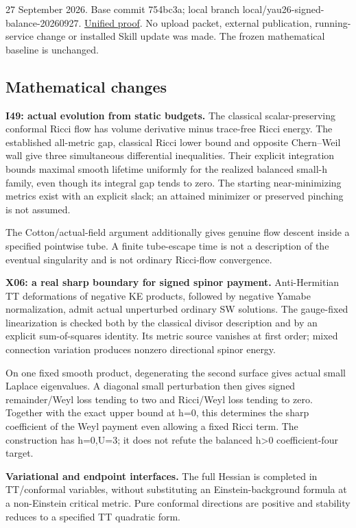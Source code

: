 \documentclass[
  10pt,
]{article}
\begin{document}
27 September 2026. Base commit 754bc3a; local branch
local/yau26-signed-balance-20260927.
\href{../continuation/20260927_signed_balance_and_conformal_flow.md}{Unified
proof}. No upload packet, external publication, running-service change
or installed Skill update was made. The frozen mathematical baseline is
unchanged.

\hypertarget{mathematical-changes-4}{%
\subsection{Mathematical changes}\label{mathematical-changes-4}}

\textbf{I49: actual evolution from static budgets.} The classical
scalar-preserving conformal Ricci flow has volume derivative minus
trace-free Ricci energy. The established all-metric gap, classical Ricci
lower bound and opposite Chern--Weil wall give three simultaneous
differential inequalities. Their explicit integration bounds maximal
smooth lifetime uniformly for the realized balanced small-h family, even
though its integral gap tends to zero. The starting near-minimizing
metrics exist with an explicit slack; an attained minimizer or preserved
pinching is not assumed.

The Cotton/actual-field argument additionally gives genuine flow descent
inside a specified pointwise tube. A finite tube-escape time is not a
description of the eventual singularity and is not ordinary Ricci-flow
convergence.

\textbf{X06: a real sharp boundary for signed spinor payment.}
Anti-Hermitian TT deformations of negative KE products, followed by
negative Yamabe normalization, admit actual unperturbed ordinary SW
solutions. The gauge-fixed linearization is checked both by the
classical divisor description and by an explicit sum-of-squares
identity. Its metric source vanishes at first order; mixed connection
variation produces nonzero directional spinor energy.

On one fixed smooth product, degenerating the second surface gives
actual small Laplace eigenvalues. A diagonal small perturbation then
gives signed remainder/Weyl loss tending to two and Ricci/Weyl loss
tending to zero. Together with the exact upper bound at h=0, this
determines the sharp coefficient of the Weyl payment even allowing a
fixed Ricci term. The construction has h=0,U=3; it does not refute the
balanced h\textgreater0 coefficient-four target.

\textbf{Variational and endpoint interfaces.} The full Hessian is
completed in TT/conformal variables, without substituting an
Einstein-background formula at a non-Einstein critical metric. Pure
conformal directions are positive and stability reduces to a specified
TT quadratic form.
\end{document}
